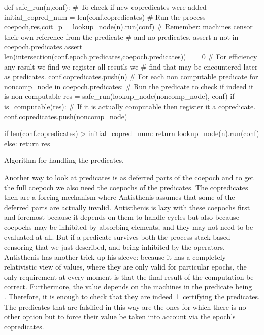 \begin{code}
\begin{pycode}
def safe_run(n,conf):
    # To check if new copredicates were added
    initial_copred_num = len(conf.copredicates)
    # Run the process
    coepoch,res,coit_p = lookup_node(n).run(conf)
    # Remember: machines censor their own reference from the predicate
    # and no predicates.
    assert n not in coepoch.predicates
    assert len(intersection(conf.epoch.predicates,coepoch.predicates)) == 0
    # For efficiency any result we find we register all resutls we
    # find that may be encountered later as predicates.
    conf.copredicates.push(n)
    # For each non computable predicate
    for noncomp_node in coepoch.predicates:
        # Run the predicate to check if indeed it is non-computable
        res = safe_run(lookup_node(noncomp_node), conf)
        if is_computable(res):
            # If it is actually computable then register it a copredicate.
            conf.copredicates.push(noncomp_node)

    if len(conf.copredicates) > initial_copred_num:
        return lookup_node(n).run(conf)
    else:
        return res
\end{pycode}
  \caption{\label{lst:algo_handle_prediates}Algorithm for handling the
    predicates.}
\end{code}

Another way to look at predicates is as deferred parts of the coepoch
and to get the full coepoch we also need the coepochs of the
predicates. The copredicates then are a forcing mechanism where
Antisthenis assumes that some of the deferred parts are actually
invalid. Antisthenis is lazy with these coepochs first and foremost
because it depends on them to handle cycles but also because coepochs
may be inhibited by absorbing elements, and they may not need to be
evaluated at all. But if a predicate survives both the process stack
based censoring that we just described, and being inhibited by the
operators, Antisthenis has another trick up his sleeve: because it has
a completely relativistic view of values, where they are only valid
for particular epochs, the only requirement at every moment is that
the final result of the computation be correct. Furthermore, the value
depends on the machines in the predicate being \(\bot\). Therefore, it
is enough to check that they are indeed \(\bot\) certifying the
predicates. The predicates that are falsified in this way are the ones
for which there is no other option but to force their value be taken
into account via the epoch's copredicates.

